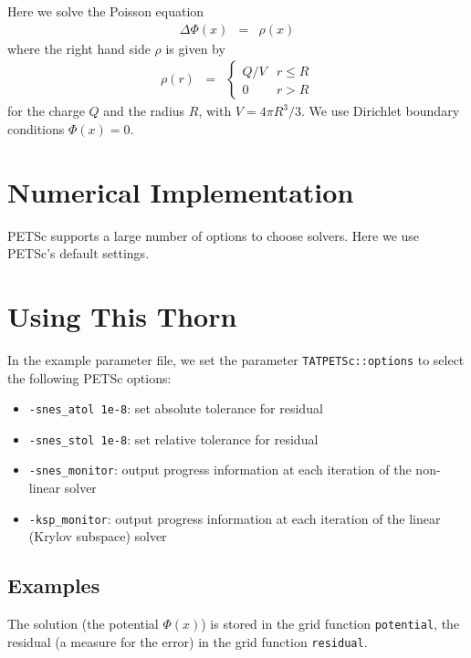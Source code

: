 Here we solve the Poisson equation
\begin{eqnarray}
  \Delta\Phi(x) &=& \rho(x)
\end{eqnarray}
where the right hand side $\rho$ is given by
\begin{eqnarray}
  \rho(r) & = & \left\{
  \begin{array}{ll}
    Q/V & r\le R \\
    0 & r>R
  \end{array}
  \right.
\end{eqnarray}
for the charge $Q$ and the radius $R$, with $V=4\pi R^3/3$. We use
Dirichlet boundary conditions $\Phi(x)=0$.

\section{Numerical Implementation}

PETSc supports a large number of options to choose solvers. Here we
use PETSc's default settings.

\section{Using This Thorn}

In the example parameter file, we set the parameter
\texttt{TATPETSc::options} to select the following PETSc options:
\begin{itemize}
\item \verb+-snes_atol 1e-8+: set absolute tolerance for residual
\item \verb+-snes_stol 1e-8+: set relative tolerance for residual
\item \verb+-snes_monitor+: output progress information at each
  iteration of the non-linear solver
\item \verb+-ksp_monitor+: output progress information at each
  iteration of the linear (Krylov subspace) solver
\end{itemize}

\subsection{Examples}

The solution (the potential $\Phi(x)$) is stored in the grid function
\texttt{potential}, the residual (a measure for the error) in the grid
function \texttt{residual}.



